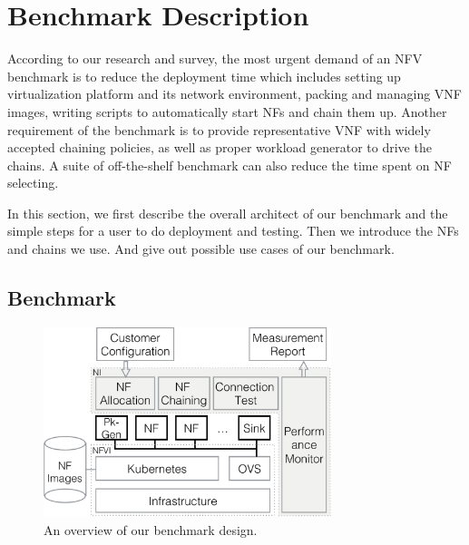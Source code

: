 \section{Benchmark Description}

According to our research and survey,
the most urgent demand of an NFV benchmark is 
to reduce the deployment time which includes 
setting up virtualization platform and its network environment, 
packing and managing VNF images, 
writing scripts to automatically start NFs and chain them up. 
Another requirement of the benchmark is to provide 
representative VNF with widely accepted chaining policies, 
as well as proper workload generator to drive the chains.
A suite of off-the-shelf benchmark can also 
reduce the time spent on NF selecting. 

In this section, we first describe the overall architect of our benchmark 
and the simple steps for a user to do deployment and testing. 
Then we introduce the NFs and chains we use. 
And give out possible use cases of our benchmark.

%

%
%
%

\subsection{Benchmark}

\begin{figure}[!t]
\centering
\includegraphics[width=3.3in]{fig/design2.pdf}
\caption{An overview of our benchmark design.}
\label{design}
\end{figure}

